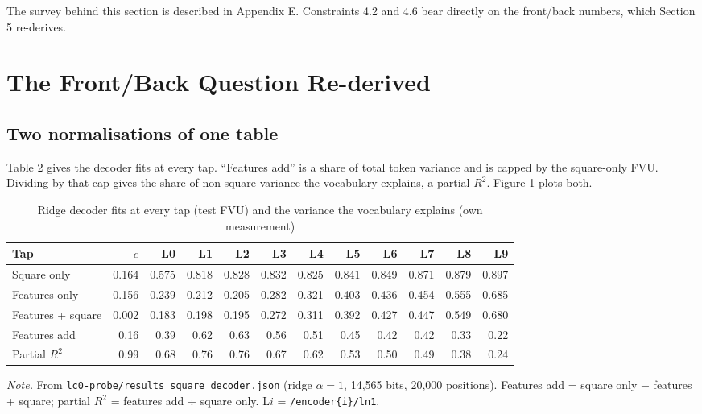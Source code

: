 \documentclass[conference]{IEEEtran}
\begin{document}
The survey behind this section is described in Appendix E. Constraints 4.2 and 4.6 bear directly on the front/\allowbreak{}back numbers, which Section 5 re-derives.

\section{The Front/\allowbreak{}Back Question Re-derived}\label{sec:5}
\subsection{Two normalisations of one table}\label{sec:5.1}
Table 2 gives the decoder fits at every tap. ``Features add'' is a share of total token variance and is capped by the square-only FVU. Dividing by that cap gives the share of non-square variance the vocabulary explains, a partial $R^2$. Figure 1 plots both.

\begin{table}[!t]
\centering
\renewcommand{\thetable}{2}
\caption{Ridge decoder fits at every tap (test FVU) and the variance the vocabulary explains (own measurement)}
\label{tab:2}
\footnotesize
\begin{tabular}{lrrrrrrrrrrr}
\toprule
Tap & $e$ & L0 & L1 & L2 & L3 & L4 & L5 & L6 & L7 & L8 & L9 \\
\midrule
Square only & 0.164 & 0.575 & 0.818 & 0.828 & 0.832 & 0.825 & 0.841 & 0.849 & 0.871 & 0.879 & 0.897 \\
Features only & 0.156 & 0.239 & 0.212 & 0.205 & 0.282 & 0.321 & 0.403 & 0.436 & 0.454 & 0.555 & 0.685 \\
Features + square & 0.002 & 0.183 & 0.198 & 0.195 & 0.272 & 0.311 & 0.392 & 0.427 & 0.447 & 0.549 & 0.680 \\
Features add & 0.16 & 0.39 & 0.62 & 0.63 & 0.56 & 0.51 & 0.45 & 0.42 & 0.42 & 0.33 & 0.22 \\
Partial $R^2$ & 0.99 & 0.68 & 0.76 & 0.76 & 0.67 & 0.62 & 0.53 & 0.50 & 0.49 & 0.38 & 0.24 \\
\bottomrule
\end{tabular}
\par\smallskip
\parbox{\textwidth}{\footnotesize \emph{Note.} From \texttt{lc0-\allowbreak{}probe/\allowbreak{}results\_\allowbreak{}square\_\allowbreak{}decoder.\allowbreak{}json} (ridge $\alpha=1$, 14,565 bits, 20,000 positions). Features add = square only $-$ features + square; partial $R^2$ = features add $\div$ square only. L$i$ = \texttt{/\allowbreak{}encoder\{i\}/\allowbreak{}ln1}.}
\end{table}
\end{document}
